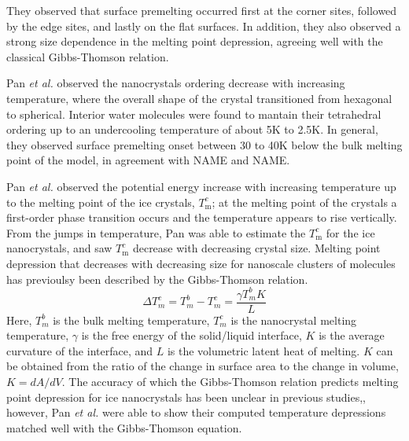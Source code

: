 They observed that surface premelting occurred first at the corner
sites, followed by the edge sites, and lastly on the flat surfaces.
In addition, they also observed a strong size dependence in the
melting point depression, agreeing well with the classical
Gibbs-Thomson relation. 

Pan \textit{et al.} observed the nanocrystals ordering decrease with
increasing temperature, where the overall shape of the crystal
transitioned from hexagonal to spherical. Interior water molecules
were found to mantain their tetrahedral ordering up to an undercooling
temperature of about 5K to 2.5K. In general, they observed surface
premelting onset between 30 to 40K below the bulk melting point of the
model, in agreement with NAME and NAME. 

Pan \textit{et al.} observed the potential energy increase with
increasing temperature up to the melting point of the ice crystals,
$T^{c}_\mathrm{m}$; at the melting point of the crystals a first-order
phase transition occurs and the temperature appears to rise
vertically. From the jumps in temperature, Pan was able to estimate
the $T^{c}_\mathrm{m}$ for the ice nanocrystals, and saw
$T^{c}_\mathrm{m}$ decrease with decreasing crystal size. Melting
point depression that decreases with decreasing size for nanoscale
clusters of molecules has previoulsy been described by the
Gibbs-Thomson relation. 
\begin{equation}\label{GibbsThomson}
\Delta T^{c}_{m} = T^{b}_{m} - T^{c}_{m} = \frac{\gamma T^{b}_{m} K}{L}
\end{equation}
Here, $T^{b}_{m}$ is the bulk melting temperature, $T^{c}_{m}$ is the
nanocrystal melting temperature, $\gamma$ is the free energy of the
solid/liquid interface, $K$ is the average curvature of the interface,
and $L$ is the volumetric latent heat of melting. $K$ can be obtained
from the ratio of the change in surface area to the change in volume,
$K = dA/dV$. The accuracy of which the Gibbs-Thomson relation predicts
melting point depression for ice nanocrystals has been unclear in
previous studies,\cite{Makkonen00,Makkonen02,Della02,Campbell02},
however, Pan \textit{et al.} were able to show their computed
temperature depressions matched well with the Gibbs-Thomson equation.

